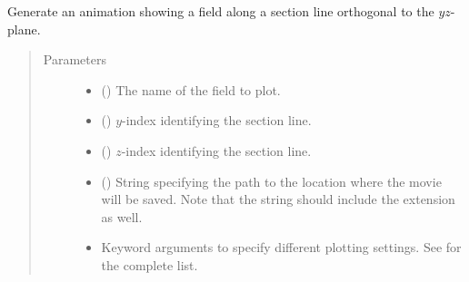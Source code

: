 \documentclass[letterpaper,10pt,english]{sphinxmanual}
\begin{document}
\begin{fulllineitems}
\begin{fulllineitems}
\label{\detokenize{api:storages.grid_data.GridData.animation_profile_x}}
Generate an animation showing a field along a section line orthogonal to the \(yz\)-plane.
\begin{quote}\begin{description}
\item[{Parameters}] \leavevmode\begin{itemize}
\item {} 
 () \textendash{} The name of the field to plot.

\item {} 
 () \textendash{} \(y\)-index identifying the section line.

\item {} 
 () \textendash{} \(z\)-index identifying the section line.

\item {} 
 () \textendash{} String specifying the path to the location where the movie will be saved.
Note that the string should include the extension as well.

\item {} 
 \textendash{} Keyword arguments to specify different plotting settings.
See {\hyperref[\detokenize{api:tasmania.utils.utils_plot.animation_profile_x}]{}} for the complete list.

\end{itemize}

\end{description}\end{quote}

\end{fulllineitems}



\end{fulllineitems}
\end{document}
